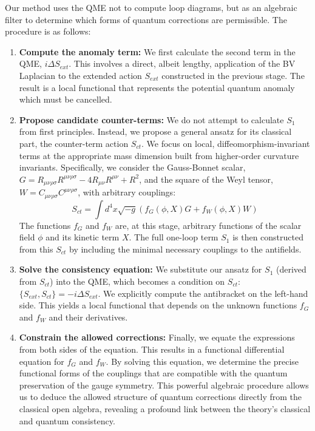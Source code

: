 \documentclass[twocolumn]{aastex631}
\begin{document}
Our method uses the QME not to compute loop diagrams, but as an algebraic filter to determine which forms of quantum corrections are permissible. The procedure is as follows:
\begin{enumerate}
    \item \textbf{Compute the anomaly term:} We first calculate the second term in the QME, $i \Delta S_{ext}$. This involves a direct, albeit lengthy, application of the BV Laplacian to the extended action $S_{ext}$ constructed in the previous stage. The result is a local functional that represents the potential quantum anomaly which must be cancelled.
    \item \textbf{Propose candidate counter-terms:} We do not attempt to calculate $S_1$ from first principles. Instead, we propose a general ansatz for its classical part, the counter-term action $S_{ct}$. We focus on local, diffeomorphism-invariant terms at the appropriate mass dimension built from higher-order curvature invariants. Specifically, we consider the Gauss-Bonnet scalar, $G = R_{\mu\nu\rho\sigma}R^{\mu\nu\rho\sigma} - 4 R_{\mu\nu}R^{\mu\nu} + R^2$, and the square of the Weyl tensor, $W = C_{\mu\nu\rho\sigma}C^{\mu\nu\rho\sigma}$, with arbitrary couplings:
    \begin{equation}
S_{ct} = \int d^4x \sqrt{-g} \left( f_G(\phi, X) G + f_W(\phi, X) W \right)
    \end{equation}
The functions $f_G$ and $f_W$ are, at this stage, arbitrary functions of the scalar field $\phi$ and its kinetic term $X$. The full one-loop term $S_1$ is then constructed from this $S_{ct}$ by including the minimal necessary couplings to the antifields.
    \item \textbf{Solve the consistency equation:} We substitute our ansatz for $S_1$ (derived from $S_{ct}$) into the QME, which becomes a condition on $S_{ct}$: $\{S_{ext}, S_{ct}\} = -i \Delta S_{ext}$. We explicitly compute the antibracket on the left-hand side. This yields a local functional that depends on the unknown functions $f_G$ and $f_W$ and their derivatives.
    \item \textbf{Constrain the allowed corrections:} Finally, we equate the expressions from both sides of the equation. This results in a functional differential equation for $f_G$ and $f_W$. By solving this equation, we determine the precise functional forms of the couplings that are compatible with the quantum preservation of the gauge symmetry. This powerful algebraic procedure allows us to deduce the allowed structure of quantum corrections directly from the classical open algebra, revealing a profound link between the theory's classical and quantum consistency.
\end{enumerate}
\end{document}
